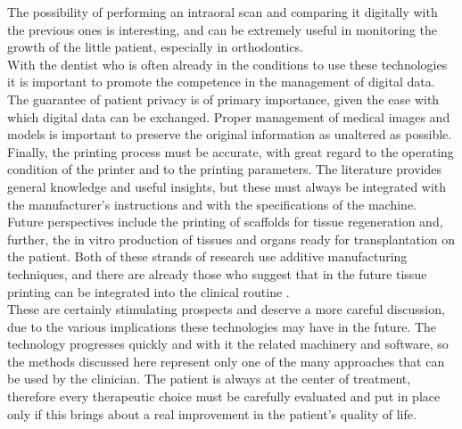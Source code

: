 The possibility of performing an intraoral scan and comparing it digitally with the previous ones is interesting, and can be extremely useful in monitoring the growth of the little patient, especially in orthodontics. \\
With the dentist who is often already in the conditions to use these technologies it is important to promote the competence in the management of digital data. The guarantee of patient privacy is of primary importance, given the ease with which digital data can be exchanged. Proper management of medical images and models is important to preserve the original information as unaltered as possible. Finally, the printing process must be accurate, with great regard to the operating condition of the printer and to the printing parameters. The literature provides general knowledge and useful insights, but these must always be integrated with the manufacturer's instructions and with the specifications of the machine.
Future perspectives include the printing of scaffolds for tissue regeneration and, further, the in vitro production of tissues and organs ready for transplantation on the patient. Both of these strands of research use additive manufacturing techniques, and there are already those who suggest that in the future tissue printing can be integrated into the clinical routine \parencite{Reference142}. \\
These are certainly stimulating prospects and deserve a more careful discussion, due to the various implications these technologies may have in the future. The technology progresses quickly and with it the related machinery and software, so the methods discussed here represent only one of the many approaches that can be used by the clinician. The patient is always at the center of treatment, therefore every therapeutic choice must be carefully evaluated and put in place only if this brings about a real improvement in the patient's quality of life.
